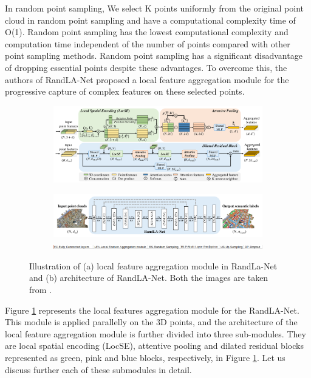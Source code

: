 In random point sampling, We select K points uniformly from the original point cloud in random point sampling and have a computational complexity time of O(1).
Random point sampling has the lowest computational complexity and computation time independent of the number of points compared with other point sampling methods.
Random point sampling has a significant disadvantage of dropping essential points despite these advantages.
To overcome this, the authors of RandLA-Net proposed a local feature aggregation module for the progressive capture of complex features on these selected points.
\begin{figure}
    \centering
    \begin{subfigure}{0.45\textwidth}
        \centering
            \includegraphics[scale=0.4, angle=90]{images/localfeatueaggregation-randlanet.png}
            \caption{}
            \label{fig:randlanetlfa}       
    \end{subfigure}
    \begin{subfigure}{0.45\textwidth}
        \centering
            \includegraphics[scale=0.55, angle=90]{images/randlanet.png}
            \includegraphics[scale=0.55, angle=90]{images/archi_expl.png}
            \caption{}
            \label{fig:networkarchitecture}
    \end{subfigure}
    \caption{Illustration of (a) local feature aggregation module in RandLa-Net and (b) architecture of RandLA-Net. Both the images are taken from \cite{Hu_2020_CVPR_Randla}.}
\end{figure}

Figure \ref{fig:randlanetlfa} represents the local features aggregation module for the RandLA-Net.
This module is applied parallelly on the 3D points, and the architecture of the local feature aggregation module is further divided into three sub-modules.
They are local spatial encoding (LocSE), attentive pooling and dilated residual blocks represented as green, pink and blue blocks, respectively, in Figure \ref{fig:randlanetlfa}.
Let us discuss further each of these submodules in detail.


